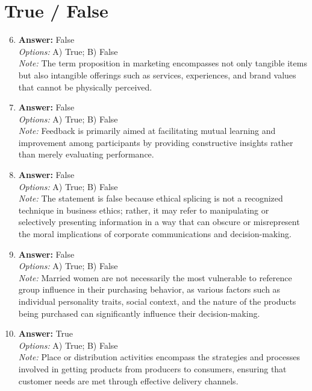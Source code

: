 \documentclass[12pt]{article}
\begin{document}
\section*{True / False}
\begin{enumerate}[label=\arabic*.]
\setcounter{enumi}{5}
\item \textbf{Answer:} False
\\ \textit{Options:} A) True; B) False
\\ \textit{Note:} The term proposition in marketing encompasses not only tangible items but also intangible offerings such as services, experiences, and brand values that cannot be physically perceived.
\item \textbf{Answer:} False
\\ \textit{Options:} A) True; B) False
\\ \textit{Note:} Feedback is primarily aimed at facilitating mutual learning and improvement among participants by providing constructive insights rather than merely evaluating performance.
\item \textbf{Answer:} False
\\ \textit{Options:} A) True; B) False
\\ \textit{Note:} The statement is false because ethical splicing is not a recognized technique in business ethics; rather, it may refer to manipulating or selectively presenting information in a way that can obscure or misrepresent the moral implications of corporate communications and decision-making.
\item \textbf{Answer:} False
\\ \textit{Options:} A) True; B) False
\\ \textit{Note:} Married women are not necessarily the most vulnerable to reference group influence in their purchasing behavior, as various factors such as individual personality traits, social context, and the nature of the products being purchased can significantly influence their decision-making.
\item \textbf{Answer:} True
\\ \textit{Options:} A) True; B) False
\\ \textit{Note:} Place or distribution activities encompass the strategies and processes involved in getting products from producers to consumers, ensuring that customer needs are met through effective delivery channels.
\end{enumerate}
\end{document}
